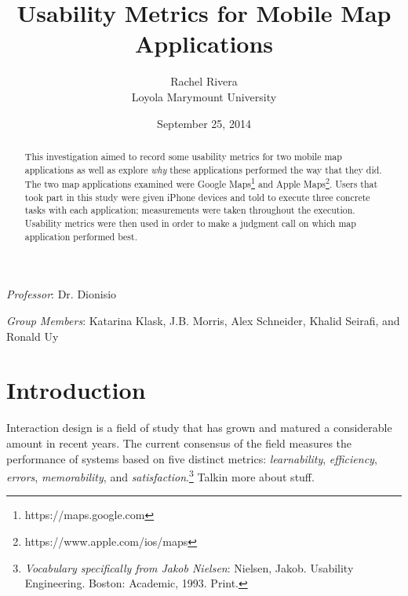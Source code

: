 \documentclass[a4paper, 11pt]{article}
\begin{document}
\title{Usability Metrics for Mobile Map Applications}

\author{Rachel Rivera\\
  Loyola Marymount University}

\date{September 25, 2014}


\renewcommand{\thefootnote}{\fnsymbol{footnote}}


\maketitle

\vspace{-.2in}
\begin{abstract}
\noindent This investigation aimed to record some usability metrics for two mobile map applications as well as explore \textit{why} these applications performed the way that they did. The two map applications examined were Google Maps\footnote{https://maps.google.com} and Apple Maps\footnote{https://www.apple.com/ios/maps}. Users that took part in this study were given iPhone devices and told to execute three concrete tasks with each application; measurements were taken throughout the execution. Usability metrics were then used in order to make a judgment call on which map application performed best.
\end{abstract}

\medskip
\medskip

\noindent \textit{Professor}: Dr. Dionisio

\medskip
\noindent \textit{Group Members}: Katarina Klask, J.B. Morris, Alex Schneider, Khalid Seirafi, and Ronald Uy

\thispagestyle{empty}

\clearpage

\setcounter{footnote}{0}
\renewcommand{\thefootnote}{\arabic{footnote}}
\setcounter{page}{1}

\section{Introduction}

Interaction design is a field of study that has grown and matured a considerable amount in recent years. The current consensus of the field measures the performance of systems based on five distinct metrics: \textit{learnability}, \textit{efficiency}, \textit{errors}, \textit{memorability}, and \textit{satisfaction}.\footnote[1]{\textit{Vocabulary specifically from Jakob Nielsen}: Nielsen, Jakob. Usability Engineering. Boston: Academic, 1993. Print.} Talkin more about stuff.
\end{document}
